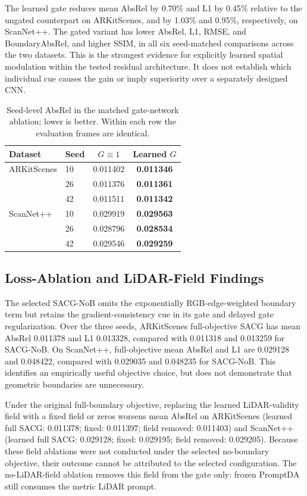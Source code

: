 The learned gate reduces mean AbsRel by 0.70\% and L1 by 0.45\% relative to the ungated counterpart on ARKitScenes, and by 1.03\% and 0.95\%, respectively, on ScanNet++. The gated variant has lower AbsRel, L1, RMSE, and BoundaryAbsRel, and higher SSIM, in all six seed-matched comparisons across the two datasets. This is the strongest evidence for explicitly learned spatial modulation within the tested residual architecture. It does not establish which individual cue causes the gain or imply superiority over a separately designed CNN.

\begin{table}[t]
\caption{Seed-level AbsRel in the matched gate-network ablation; lower is better. Within each row the evaluation frames are identical.}
\label{tab:gate_seeds}
\centering\small
\begin{tabular}{llcc}
\toprule
Dataset & Seed & $G\equiv1$ & Learned $G$\\
\midrule
ARKitScenes & 10 & 0.011402 & \textbf{0.011346}\\
& 26 & 0.011376 & \textbf{0.011361}\\
& 42 & 0.011511 & \textbf{0.011342}\\
\midrule
ScanNet++ & 10 & 0.029919 & \textbf{0.029563}\\
& 26 & 0.028796 & \textbf{0.028534}\\
& 42 & 0.029546 & \textbf{0.029259}\\
\bottomrule
\end{tabular}
\end{table}

\subsection{Loss-Ablation and LiDAR-Field Findings}
The selected SACG-NoB omits the exponentially RGB-edge-weighted boundary term but retains the gradient-consistency cue in its gate and delayed gate regularization. Over the three seeds, ARKitScenes full-objective SACG has mean AbsRel 0.011378 and L1 0.013328, compared with 0.011318 and 0.013259 for SACG-NoB. On ScanNet++, full-objective mean AbsRel and L1 are 0.029128 and 0.048422, compared with 0.029035 and 0.048235 for SACG-NoB. This identifies an empirically useful objective choice, but does not demonstrate that geometric boundaries are unnecessary.

Under the original full-boundary objective, replacing the learned LiDAR-validity field with a fixed field or zeros worsens mean AbsRel on ARKitScenes (learned full SACG: 0.011378; fixed: 0.011397; field removed: 0.011403) and ScanNet++ (learned full SACG: 0.029128; fixed: 0.029195; field removed: 0.029205). Because these field ablations were not conducted under the selected no-boundary objective, their outcome cannot be attributed to the selected configuration. The no-LiDAR-field ablation removes this field from the gate only: frozen PromptDA still consumes the metric LiDAR prompt.

